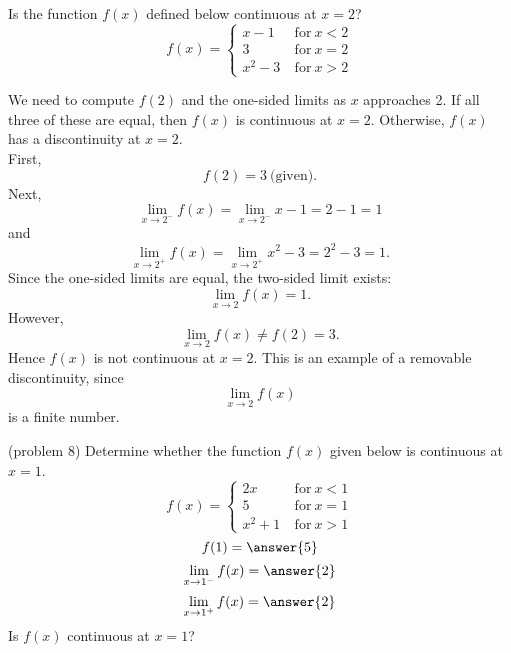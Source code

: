 \documentclass{ximera}
\begin{document}
\begin{example}[example 8]
Is the function $f(x)$ defined below continuous at $x = 2$?
\[
f(x) = \left\{
     \begin{array}{lr}
       x-1 & \ \text{for} \  x < 2 \\
			 3 & \ \text{for} \  x = 2 \\
       x^2 - 3 & \ \text{for} \ x > 2
     \end{array}
   \right.
\]


We need to  compute $f(2)$ and the one-sided limits as $x$ approaches 2.
If all three of these are equal, then $f(x)$ is continuous at $x=2$.
Otherwise, $f(x)$ has a discontinuity at $x=2$.\\
First, 
\[
f(2) = 3 \ \text{(given)}.
\]
Next, 
\[
\lim_{x \to 2^-} f(x) = \lim_{x \to 2^-} x-1 = 2-1 = 1
\]
and
\[
\lim_{x \to 2^+} f(x) = \lim_{x \to 2^+} x^2 - 3 = 2^2 - 3 = 1.
\]
Since the one-sided limits are equal, the two-sided limit exists:
\[
\lim_{x \to 2} f(x) = 1.
\]
However,
\[
\lim_{x \to 2} f(x) \neq f(2) = 3.
\]
Hence $f(x)$ is not continuous at $x = 2$.
This is an example of a removable discontinuity, since 
\[\lim_{x \to 2} f(x) \]
is a finite number.
\end{example}


\begin{problem}(problem 8)
Determine whether the function $f(x)$ given below is continuous at $x = 1$.
\[
f(x) = \left\{
     \begin{array}{lr}
       2x & \ \text{for} \  x < 1 \\
			 5 & \ \text{for} \  x = 1 \\
       x^2 + 1 & \ \text{for} \ x > 1
     \end{array}
   \right.
\]
\[
f(1) = \answer{5}
\]
\[
\lim_{x \to 1^-} f(x) = \answer{2}
\]
\[
\lim_{x \to 1^+} f(x) = \answer{2}
\]
Is $f(x)$ continuous at $x = 1$?
\begin{multipleChoice}
\end{multipleChoice}
\end{problem}
\end{document}
